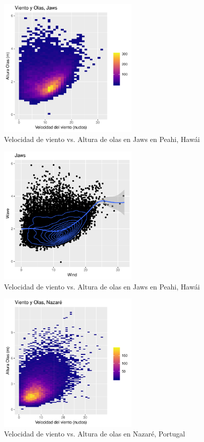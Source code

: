 \begin{figure}[H]
    \centering
    \includegraphics[width=0.6\textwidth]{./figures/jaws_bin2d.pdf}
    \caption{Velocidad de viento vs. Altura de olas en Jaws en Peahi, Hawái}
    \label{fig:wind_waves_jaws}
\end{figure}

\begin{figure}[H]
    \centering
    \includegraphics[width=0.6\textwidth]{./figures/jaws_smooth.pdf}
    \caption{Velocidad de viento vs. Altura de olas en Jaws en Peahi, Hawái}
    \label{fig:jaws_smooth}
\end{figure}

\begin{figure}[H]
    \centering
    \includegraphics[width=0.6\textwidth]{./figures/nazare_bin2d.pdf}
    \caption{Velocidad de viento vs. Altura de olas en Nazaré, Portugal}
    \label{fig:wind_waves_nazare}
\end{figure}

